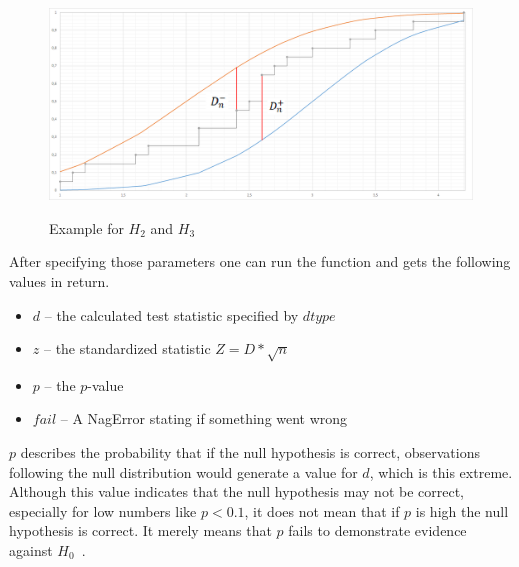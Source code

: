 \documentclass{article}
\begin{document}
\begin{figure}[here]
\caption{Example for $H_2$ and $H_3$}
\center
\includegraphics[width=.99\textwidth]{figures/diagramKSd-d+.png}
\label{fig:2}
\end{figure}
\newpage

After specifying those parameters one can run the function and gets the following values in return.
\begin{itemize}
\item $d$ -- the calculated test statistic specified by $dtype$
\item $z$ -- the standardized  statistic $Z=D*\sqrt n$
\item $p$ -- the $p$-value
\item $fail$ -- A NagError stating if something went wrong
\end{itemize}
$p$ describes the probability that if the null hypothesis is correct, observations following the null distribution would generate a value for $d$, which is this extreme.
Although this value indicates that the null hypothesis may not be correct, especially for low numbers like $p<0.1$, it does not mean that if $p$ is high the null hypothesis is correct. It merely means that $p$ fails to demonstrate evidence against $H_0$~\cite{conover1980practical}.
\end{document}
